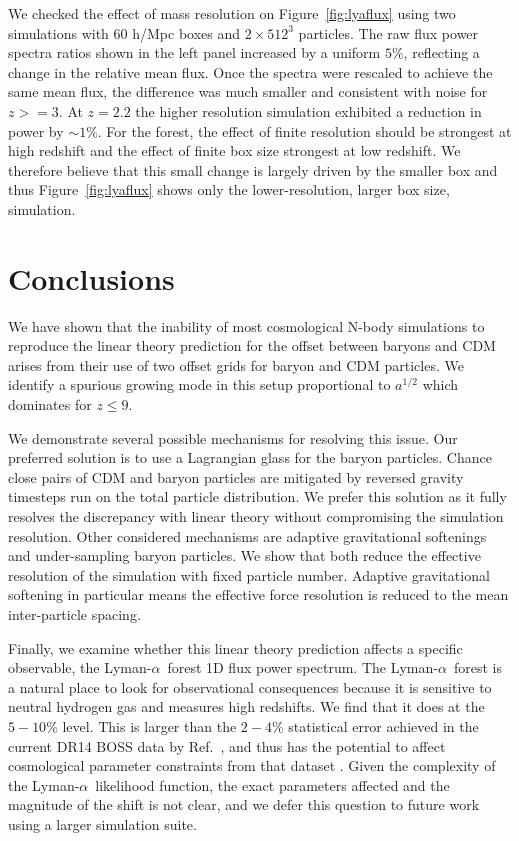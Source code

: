 \documentclass[a4paper,11pt]{article}
\newcommand{\Lya}{Lyman-$\alpha$}
\begin{document}
We checked the effect of mass resolution on Figure~\ref{fig:lyaflux} using two simulations with $60$ h/Mpc boxes and $2\times 512^3$ particles. The raw flux power spectra ratios shown in the left panel increased by a uniform $5\%$, reflecting a change in the relative mean flux. Once the spectra were rescaled to achieve the same mean flux, the difference was much smaller and consistent with noise for $z >= 3$. At $z=2.2$ the higher resolution simulation exhibited a reduction in power by $\sim 1\%$. For the forest, the effect of finite resolution should be strongest at high redshift \cite{Bolton:2009} and the effect of finite box size strongest at low redshift. We therefore believe that this small change is largely driven by the smaller box and thus Figure~\ref{fig:lyaflux} shows only the lower-resolution, larger box size, simulation.

\section{Conclusions}
\label{sec:conclude}

We have shown that the inability of most cosmological N-body simulations to reproduce the linear theory prediction for the offset between baryons and CDM arises from their use of two offset grids for baryon and CDM particles. We identify a spurious growing mode in this setup proportional to $a^{1/2}$ which dominates for $z \leq 9$.

We demonstrate several possible mechanisms for resolving this issue. Our preferred solution is to use a Lagrangian glass for the baryon particles. Chance close pairs of CDM and baryon particles are mitigated by reversed gravity timesteps run on the total particle distribution. We prefer this solution as it fully resolves the discrepancy with linear theory without compromising the simulation resolution. Other considered mechanisms are adaptive gravitational softenings and under-sampling baryon particles. We show that both reduce the effective resolution of the simulation with fixed particle number. Adaptive gravitational softening in particular means the effective force resolution is reduced to the mean inter-particle spacing.

Finally, we examine whether this linear theory prediction affects a specific observable, the \Lya~forest 1D flux power spectrum. The \Lya~forest is a natural place to look for observational consequences because it is sensitive to neutral hydrogen gas and measures high redshifts.
We find that it does at the $5-10\%$ level. This is larger than the $2-4\%$ statistical error achieved in the current DR14 BOSS data by Ref.~\cite{Chabanier:2019}, and thus has the potential to affect cosmological parameter constraints from that dataset \cite[e.g][]{PD2019}. Given the complexity of the \Lya~likelihood function, the exact parameters affected and the magnitude of the shift is not clear, and we defer this question to future work using a larger simulation suite.
\end{document}

